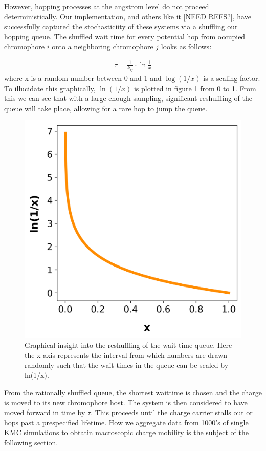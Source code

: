 However, hopping processes at the angstrom level do not proceed deterministically. 
Our implementation, and others like it [NEED REFS?], have
successfully captured the stochasticiity of these systems via a shuffling our hopping queue.
The shuffled wait time for every potential hop from occupied chromophore $i$ onto a
neighboring chromophore $j$ looks as follows:

\begin{align}
    \tau = \frac{1}{k_{ij}} \cdot \ln{\frac{1}{x}} 
\end{align}
where x is a random number between 0 and 1 and $\log{(1/x)}$ is a scaling factor. To illucidate this
graphically, $\ln{(1/x)}$ is plotted in figure \ref{fig:ln} from 0 to 1. From this we can see that with
a large enough sampling, significant reshuffling of the queue will take place, allowing for a rare hop to jump
the queue.

\begin{figure}
  \center
  \includegraphics[width=0.8\linewidth]{figures/naturallog.png}
  \caption{Graphical insight into the reshuffling of the wait time queue. Here the x-axis represents the 
    interval from which numbers are drawn randomly such that the wait times in the queue can be scaled 
    by ln(1/x).}
  \label{fig:ln}
\end{figure}

From the rationally shuffled queue, the shortest waittime is chosen and the charge is moved to
its new chromophore host. The system is then considered to have moved forward in time by $\tau$. This proceeds
until the charge carrier stalls out or hops past a prespecified lifetime. How we aggregate data from 1000's of
single KMC simulations to obtatin macroscopic charge mobility is the subject of the following section.



